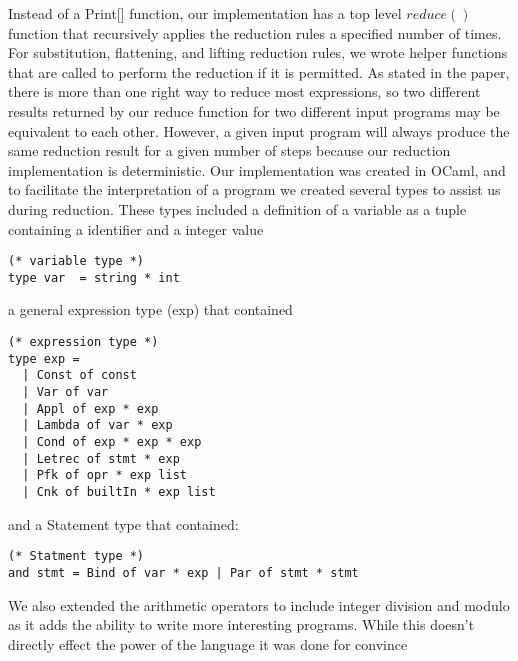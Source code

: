 \documentclass[preprint]{sigplanconf}
\begin{document}
Instead of a Print[] function, our implementation has a top level $reduce()$ function that recursively applies the reduction rules a specified number of times.  For substitution, flattening, and lifting reduction rules, we wrote helper functions that are called to perform the reduction if it is permitted.  As stated in the paper, there is more than one right way to reduce most expressions, so two different results returned by our reduce function for two different input programs may be equivalent to each other.  However, a given input program will always produce the same reduction result for a given number of steps because our reduction implementation is deterministic.  Our implementation was created in OCaml, and to facilitate the interpretation of a program we created several types to assist us during reduction. These types included a definition of a variable as a tuple containing a identifier and a integer value

\begin{verbatim}
(* variable type *)
type var  = string * int
\end{verbatim}

a general expression type (exp) that contained

\begin{verbatim}
(* expression type *)
type exp =
  | Const of const
  | Var of var
  | Appl of exp * exp
  | Lambda of var * exp
  | Cond of exp * exp * exp
  | Letrec of stmt * exp
  | Pfk of opr * exp list
  | Cnk of builtIn * exp list 
\end{verbatim}

and a Statement type that contained: 

\begin{verbatim}
(* Statment type *)
and stmt = Bind of var * exp | Par of stmt * stmt
\end{verbatim}

We also extended the arithmetic operators to include integer division and modulo as it adds the ability to write more interesting programs. While this doesn’t directly effect the power of the language it was done for convince 
\end{document}
